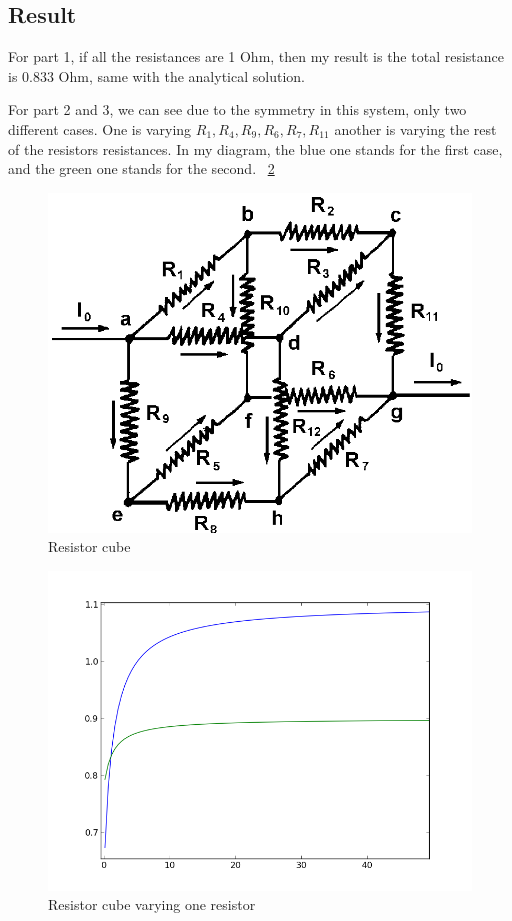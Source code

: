 \documentclass[11pt,letterpaper]{article}
\begin{document}
\subsection{Result}

For part 1, if all the resistances are 1 Ohm, then my result is the total resistance is 0.833 Ohm, same with the analytical solution.

For part 2 and 3, we can see due to the symmetry in this system, only two different cases. One is varying $R_1,R_4,R_9,R_6,R_7,R_{11}$ another is varying the rest of the resistors resistances. In my diagram, the blue one stands for the first case, and the green one stands for the second. ~\ref{figure2}

 
\begin{figure}
\begin{center}
\includegraphics[width=0.6\linewidth,angle=0]{cube.png}
\caption{Resistor cube}
\label{figure1}
\end{center}
\end{figure}

\begin{figure}
\begin{center}
\includegraphics[width=0.6\linewidth,angle=0]{p1.png}
\caption{Resistor cube varying one resistor}
\label{figure2}
\end{center}
\end{figure}
\end{document}
